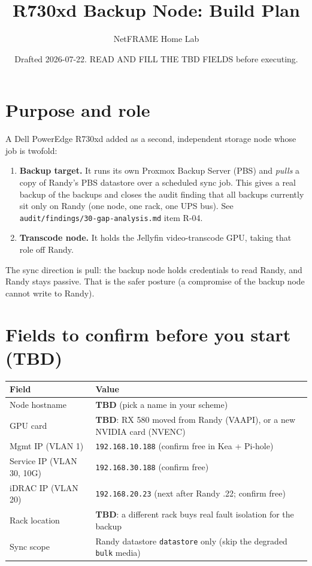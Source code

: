 \documentclass[11pt]{article}
\title{\textbf{R730xd Backup Node: Build Plan}}
\author{NetFRAME Home Lab}
\date{Drafted 2026-07-22. READ AND FILL THE TBD FIELDS before executing.}
\begin{document}
\maketitle

\section{Purpose and role}
A Dell PowerEdge R730xd added as a second, independent storage node whose job is twofold:
\begin{enumerate}
  \item \textbf{Backup target.} It runs its own Proxmox Backup Server (PBS) and \emph{pulls}
  a copy of Randy's PBS datastore over a scheduled sync job. This gives a real backup of the
  backups and closes the audit finding that all backups currently sit only on Randy (one node,
  one rack, one UPS bus). See \texttt{audit/findings/30-gap-analysis.md} item R-04.
  \item \textbf{Transcode node.} It holds the Jellyfin video-transcode GPU, taking that role
  off Randy.
\end{enumerate}
The sync direction is pull: the backup node holds credentials to read Randy, and Randy stays
passive. That is the safer posture (a compromise of the backup node cannot write to Randy).

\section{Fields to confirm before you start (TBD)}
\begin{tabular}{@{}ll@{}}
\toprule
Field & Value \\
\midrule
Node hostname & \textbf{TBD} (pick a name in your scheme) \\
GPU card & \textbf{TBD}: RX 580 moved from Randy (VAAPI), or a new NVIDIA card (NVENC) \\
Mgmt IP (VLAN 1) & \texttt{192.168.10.188} (confirm free in Kea + Pi-hole) \\
Service IP (VLAN 30, 10G) & \texttt{192.168.30.188} (confirm free) \\
iDRAC IP (VLAN 20) & \texttt{192.168.20.23} (next after Randy .22; confirm free) \\
Rack location & \textbf{TBD}: a different rack buys real fault isolation for the backup \\
Sync scope & Randy datastore \texttt{datastore} only (skip the degraded \texttt{bulk} media) \\
\bottomrule
\end{tabular}
\end{document}
